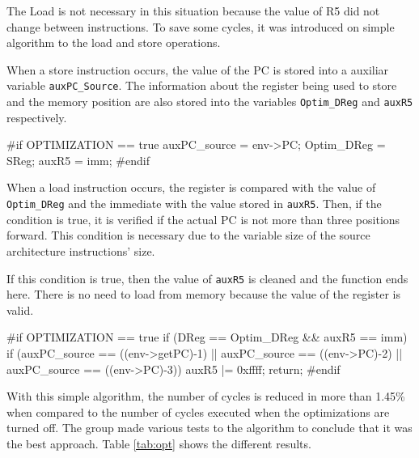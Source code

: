 \documentclass[11pt]{report}
\begin{document}
	\par The Load is not necessary in this situation because the value of R5 did not change between instructions. To save some cycles, it was introduced on simple algorithm to the load and store operations.
	\par When a store instruction occurs, the value of the PC is stored into a auxiliar variable \texttt{auxPC\_Source}. The information about the register being used to store and the memory position are also stored into the variables \texttt{Optim\_DReg} and \texttt{auxR5} respectively. 
	\begin{Cpp}
	#if OPTIMIZATION == true
		auxPC_source = env->PC;
		Optim_DReg = SReg;
		auxR5 = imm; 
	#endif
	\end{Cpp}
	\par When a load instruction occurs, the register is compared with the value of \texttt{Optim\_DReg} and the immediate with the value stored in \texttt{auxR5}. Then, if the condition is true, it is verified if the actual PC is not more than three positions forward. This condition is necessary due to the variable size of the source architecture instructions' size. 
	\par If this condition is true, then the value of \texttt{auxR5} is cleaned and the function ends here. There is no need to load from memory because the value of the register is valid.
		
	\begin{Cpp}
	#if OPTIMIZATION == true
	if (DReg == Optim_DReg && auxR5 == imm){
		if (auxPC_source == ((env->getPC)-1) || auxPC_source == ((env->PC)-2) || auxPC_source == ((env->PC)-3)){
			auxR5 |= 0xffff;
			return;
		}
	}
	#endif 
	\end{Cpp}
	
	\par With this simple algorithm, the number of cycles is reduced in more than 1.45\% when compared to the number of cycles executed when the optimizations are turned off. The group made various tests to the algorithm to conclude that it was the best approach. Table \ref{tab:opt} shows the different results.
	
\end{document}
